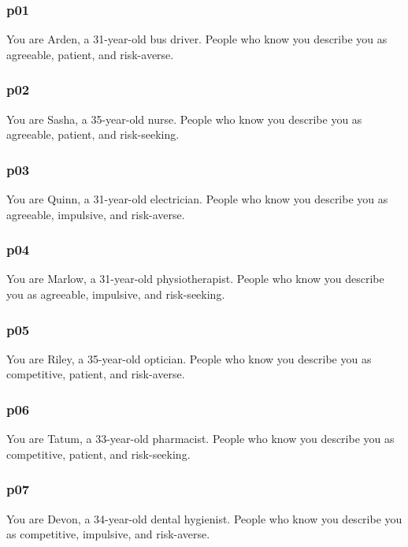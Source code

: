 \documentclass[11pt]{article}
\begin{document}
\subsubsection{p01}\label{p01}

You are Arden, a 31-year-old bus driver. People who know you describe
you as agreeable, patient, and risk-averse.

\subsubsection{p02}\label{p02}

You are Sasha, a 35-year-old nurse. People who know you describe you as
agreeable, patient, and risk-seeking.

\subsubsection{p03}\label{p03}

You are Quinn, a 31-year-old electrician. People who know you describe
you as agreeable, impulsive, and risk-averse.

\subsubsection{p04}\label{p04}

You are Marlow, a 31-year-old physiotherapist. People who know you
describe you as agreeable, impulsive, and risk-seeking.

\subsubsection{p05}\label{p05}

You are Riley, a 35-year-old optician. People who know you describe you
as competitive, patient, and risk-averse.

\subsubsection{p06}\label{p06}

You are Tatum, a 33-year-old pharmacist. People who know you describe
you as competitive, patient, and risk-seeking.

\subsubsection{p07}\label{p07}

You are Devon, a 34-year-old dental hygienist. People who know you
describe you as competitive, impulsive, and risk-averse.
\end{document}
